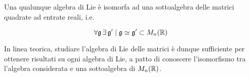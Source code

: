 \begin{theorem}
	Una qualunque algebra di Lie è isomorfa ad una sottoalgebra delle matrici quadrate ad entrate reali, i.e.
	
	\begin{equation}
		\forall \mathfrak{g} \, \exists\,  \mathfrak{g}' \mid \mathfrak{g} \simeq \mathfrak{g}' \subset M_{n}(\mathbb{R})
	\end{equation}
\end{theorem}

In linea teorica, studiare l'algebra di Lie delle matrici è dunque sufficiente per ottenere risultati su ogni algebra di Lie, a patto di conoscere l'isomorfismo tra l'algebra considerata e una sottoalgebra di $ M_{n}(\mathbb{R}) $.